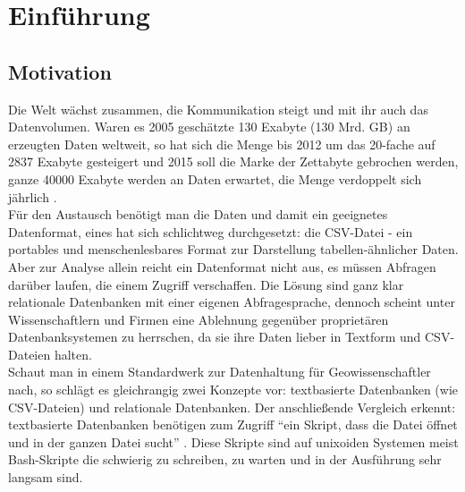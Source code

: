 \chapter{Einführung}
\label{chapter:Einfuhrung}
\section{Motivation}
Die Welt wächst zusammen, die Kommunikation steigt und mit ihr auch das Datenvolumen. Waren es 2005 geschätzte 130 Exabyte (130 Mrd. GB) an erzeugten Daten weltweit, so hat sich die Menge bis 2012 um das 20-fache auf 2837 Exabyte gesteigert und 2015 soll die Marke der Zettabyte gebrochen werden, ganze 40000 Exabyte werden an Daten erwartet, die Menge verdoppelt sich jährlich \cite{statista}.\\
Für den Austausch benötigt man die Daten und damit ein geeignetes Datenformat, eines hat sich schlichtweg durchgesetzt: die CSV-Datei - ein portables und menschenlesbares Format zur Darstellung tabellen-ähnlicher Daten.
Aber zur Analyse allein reicht ein Datenformat nicht aus, es müssen Abfragen darüber laufen, die einem Zugriff verschaffen. Die Lösung sind ganz klar relationale Datenbanken mit einer eigenen Abfragesprache, dennoch scheint unter Wissenschaftlern und Firmen eine Ablehnung gegenüber proprietären Datenbanksystemen zu herrschen, da sie ihre Daten lieber in Textform und CSV-Dateien halten.\\
Schaut man in einem Standardwerk zur Datenhaltung für Geowissenschaftler nach, so schlägt es gleichrangig zwei Konzepte vor: textbasierte Datenbanken (wie CSV-Dateien) und relationale Datenbanken. Der anschließende Vergleich erkennt: textbasierte Datenbanken benötigen zum Zugriff "`ein Skript, dass die Datei öffnet und in der ganzen Datei sucht"' \cite[S. 19]{Geo}.
Diese Skripte sind auf unixoiden Systemen meist Bash-Skripte die schwierig zu schreiben, zu warten und in der Ausführung sehr langsam sind.\\
